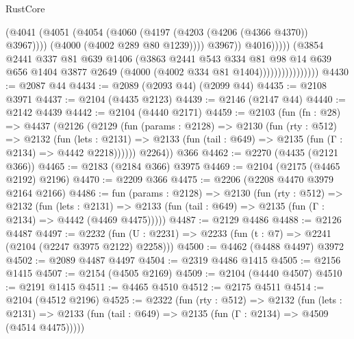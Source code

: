 \begin{lexlean}{RustCore}
\begin{coremodule}
                                          (@4041
                                            (@4051
                                              (@4054
                                                (@4060 (@4197 (@4203 (@4206 (@4366 @4370)) @3967))))
                                              (@4000 (@4002 @289 @80 @1239))))
                                          @3967))
                                      @4016)))))
                            (@3854
                              @2441
                              @337
                              @81
                              @639
                              @1406
                              (@3863
                                @2441
                                @543
                                @334
                                @81
                                @98
                                @14
                                @639
                                @656
                                @1404
                                @3877
                                @2649
                                (@4000 (@4002 @334 @81 @1404))))))))))))))))
@4430 := @2087 @44
@4434 := @2089 (@2093 @44) (@2099 @44)
@4435 := @2108 @3971
@4437 := @2104 (@4435 @2123)
@4439 := @2146 (@2147 @44)
@4440 := @2142 @4439
@4442 := @2104 (@4440 @2171)
@4459 := @2103
    (fun (fn : @28) =>
    @4437
      (@2126
        (@2129
          (fun (params : @2128) =>
          @2130
            (fun (rty : @512) =>
            @2132
              (fun (lets : @2131) =>
              @2133 (fun (tail : @649) => @2135 (fun (Γ : @2134) => @4442 @2218))))))
        @2264))
    @366
@4462 := @2270 (@4435 (@2121 @366))
@4465 := @2183 (@2184 @366) @3975
@4469 := @2104 (@2175 (@4465 @2192) @2196)
@4470 := @2209 @366
@4475 := @2206 (@2208 @4470 @3979 @2164 @2166)
@4486 := fun (params : @2128) =>
  @2130
    (fun (rty : @512) =>
    @2132
      (fun (lets : @2131) =>
      @2133 (fun (tail : @649) => @2135 (fun (Γ : @2134) => @4442 (@4469 @4475)))))
@4487 := @2129 @4486
@4488 := @2126 @4487
@4497 := @2232 (fun (U : @2231) => @2233 (fun (t : @7) => @2241 (@2104 (@2247 @3975 @2122) @2258)))
@4500 := @4462 (@4488 @4497) @3972
@4502 := @2089 @4487 @4497
@4504 := @2319 @4486 @1415
@4505 := @2156 @1415
@4507 := @2154 (@4505 @2169)
@4509 := @2104 (@4440 @4507)
@4510 := @2191 @1415
@4511 := @4465 @4510
@4512 := @2175 @4511
@4514 := @2104 (@4512 @2196)
@4525 := @2322
    (fun (rty : @512) =>
    @2132
      (fun (lets : @2131) =>
      @2133 (fun (tail : @649) => @2135 (fun (Γ : @2134) => @4509 (@4514 @4475)))))

\end{coremodule}
\end{lexlean}
